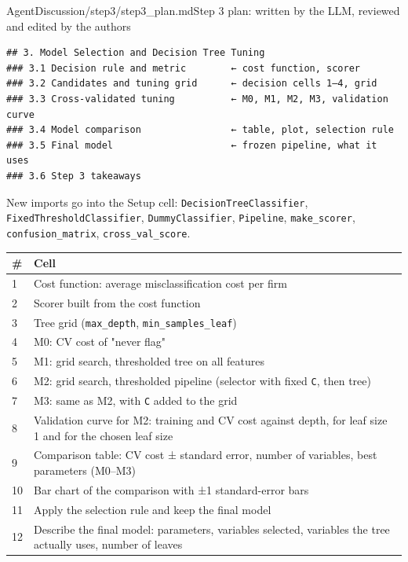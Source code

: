 \begin{mdfile}{AgentDiscussion/\allowbreak{}step3/\allowbreak{}step3\_plan.md}{Step 3 plan: written by the LLM, reviewed and edited by the authors}

\begin{Verbatim}[breaklines, fontsize=\footnotesize]
## 3. Model Selection and Decision Tree Tuning
### 3.1 Decision rule and metric        ← cost function, scorer
### 3.2 Candidates and tuning grid      ← decision cells 1–4, grid
### 3.3 Cross-validated tuning          ← M0, M1, M2, M3, validation curve
### 3.4 Model comparison                ← table, plot, selection rule
### 3.5 Final model                     ← frozen pipeline, what it uses
### 3.6 Step 3 takeaways
\end{Verbatim}


New imports go into the Setup cell: \texttt{DecisionTreeClassifier}, \texttt{FixedThresholdClassifier}, \texttt{DummyClassifier}, \texttt{Pipeline}, \texttt{make\_scorer}, \texttt{confusion\_matrix}, \texttt{cross\_val\_score}.

{\def\LTcaptype{none} %
\begin{tabularx}{\linewidth}{@{}l>{\raggedright\arraybackslash}X@{}}
\toprule\noalign{}
\# & Cell \\
\midrule\noalign{}
1 & Cost function: average misclassification cost per firm \\
2 & Scorer built from the cost function \\
3 & Tree grid (\texttt{max\_depth}, \texttt{min\_samples\_leaf}) \\
4 & M0: CV cost of "never flag" \\
5 & M1: grid search, thresholded tree on all features \\
6 & M2: grid search, thresholded pipeline (selector with fixed \texttt{C}, then tree) \\
7 & M3: same as M2, with \texttt{C} added to the grid \\
8 & Validation curve for M2: training and CV cost against depth, for leaf size 1 and for the chosen leaf size \\
9 & Comparison table: CV cost ± standard error, number of variables, best parameters (M0--M3) \\
10 & Bar chart of the comparison with ±1 standard-error bars \\
11 & Apply the selection rule and keep the final model \\
12 & Describe the final model: parameters, variables selected, variables the tree actually uses, number of leaves \\
\bottomrule
\end{tabularx}
}


\end{mdfile}
